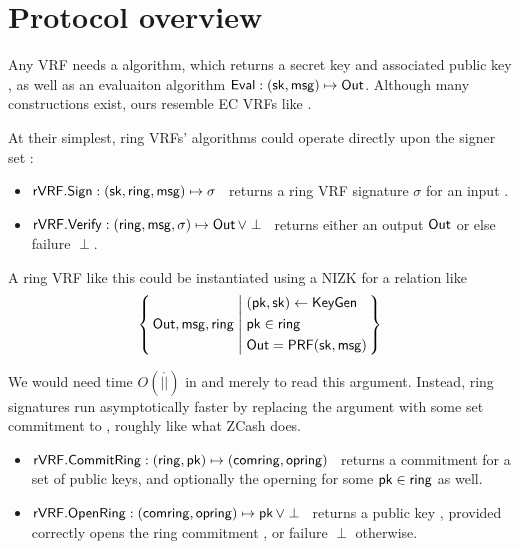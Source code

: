 \section{Protocol overview}
\label{sec:overview}

Any VRF needs a \KeyGen algorithm, which returns a secret key \sk and
associated public key \pk, as well as an evaluaiton algorithm
${\mathsf{Eval}} : (\mathsf{sk},\mathsf{msg}) \mapsto {\ensuremath{\mathsf{Out}}}$. %
%
Although many constructions exist,
 ours resemble EC VRFs like \cite{nsec5,VXEd25519,draft-irtf-cfrg-vrf-10}.

At their simplest, ring VRFs' algorithms could operate directly
upon the signer set \ring:
\begin{itemize}
\item ${\mathsf{rVRF}}.{\mathsf{Sign}} : (\mathsf{sk},\mathsf{ring},\mathsf{msg}) \mapsto \sigma$ \,
    returns a ring VRF signature $\sigma$ for an input \msg.
\item ${\mathsf{rVRF}}.{\mathsf{Verify}} : (\mathsf{ring},\mathsf{msg},\sigma) \mapsto {\ensuremath{\mathsf{Out}}} \, \lor \perp$ \,
    returns either an output ${\mathsf{Out}}$ or else failure $\perp$.
\end{itemize}

A ring VRF like this could be instantiated using a NIZK for a relation like
$$ \Setst{ \Out, \msg, \ring }{
    \eprint{
        (\pk,\sk) \leftarrow \KeyGen, \quad %
        \pk \in \ring, \quad
        \Out = \PRF(\sk,\msg)
    }{
        \begin{aligned}
        & (\pk,\sk) \leftarrow \KeyGen \\
        & \pk \in \ring \\
        & \Out = \PRF(\sk,\msg)
        \end{aligned}
    }
} $$

We would need time $O(|\ring|)$ in \rSign and \rVerify merely to read
this \ring argument.  Instead, ring signatures run asymptotically faster
by replacing the \ring argument with some set commitment to \ring,
roughly like what ZCash does.
\begin{itemize}
\item ${\mathsf{rVRF}}.{\mathsf{CommitRing}} : (\mathsf{ring},\mathsf{pk}) \mapsto (\mathsf{comring},\mathsf{opring})$ \,
    returns a commitment for a set \ring of public keys, and
    optionally the operning \openring for some $\mathsf{pk} \in \mathsf{ring}$ as well.
\item ${\mathsf{rVRF}}.{\mathsf{OpenRing}} : (\mathsf{comring},\mathsf{opring}) \mapsto \mathsf{pk} \, \lor \perp$ \,
    returns a public key \pk, provided \openring correctly opens
    the ring commitment \comring, or failure $\perp$ otherwise.
\end{itemize}

